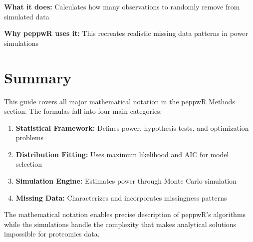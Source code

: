 \documentclass[11pt]{article}
\begin{document}
\textbf{What it does:} Calculates how many observations to randomly remove from simulated data

\textbf{Why peppwR uses it:} This recreates realistic missing data patterns in power simulations

\section{Summary}

This guide covers all major mathematical notation in the peppwR Methods section. The formulas fall into four main categories:

\begin{enumerate}
\item \textbf{Statistical Framework:} Defines power, hypothesis tests, and optimization problems
\item \textbf{Distribution Fitting:} Uses maximum likelihood and AIC for model selection
\item \textbf{Simulation Engine:} Estimates power through Monte Carlo simulation
\item \textbf{Missing Data:} Characterizes and incorporates missingness patterns
\end{enumerate}

The mathematical notation enables precise description of peppwR's algorithms while the simulations handle the complexity that makes analytical solutions impossible for proteomics data.
\end{document}
